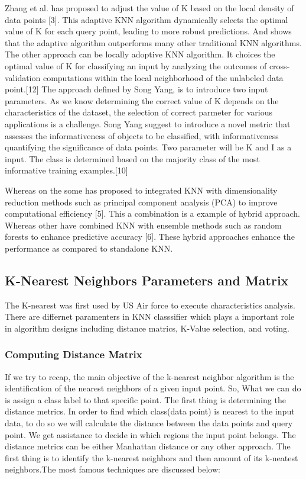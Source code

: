 \documentclass[conference]{IEEEtran}
\begin{document}
Zhang et al. has proposed to adjust the value of K based on the local density of data points [3]. This adaptive KNN algorithm dynamically selects the optimal value of K for each query point, leading to more robust predictions. And shows that the adaptive algorithm outperforms many other traditional KNN algorithms. The other approach can be locally adoptive KNN algorithm. It choices the optimal value of K for classifying an input by analyzing the outcomes of cross-validation computations within the local neighborhood of the unlabeled data point.[12]  The approach defined by Song Yang, is to introduce two input parameters. As we know determining the correct value of K depends on the characteristics of the dataset, the selection of correct parmeter for various applications is a challenge. Song Yang suggest to introduce a novel metric that assesses the informativeness of objects to be classified, with informativeness quantifying the significance of data points. 
Two parameter will be K and I as a input. The class is determined based on the majority class of the most informative training examples.[10]

Whereas on the some has proposed to integrated KNN with dimensionality reduction methods such as principal component analysis (PCA) to improve computational efficiency [5]. This a combination is a example of hybrid approach. Whereas other have combined KNN with ensemble methods such as random forests to enhance predictive accuracy [6]. These hybrid approaches enhance the performance as compared to standalone KNN. 








\subsection{K-Nearest Neighbors Parameters and Matrix}
The K-nearest was first used by US Air force to execute characteristics analysis. There are differnet paramenters in KNN classsifier which plays a important role in algorithm designs including distance matrics, K-Value selection, and voting. 




\subsubsection{Computing Distance Matrix}
If we try to recap, the main objective of the k-nearest neighbor algorithm is the identification of the nearest neighbors of a given input point. So, What we can do is assign a class label to that specific point. The first thing is determining the distance metrics. In order to find which class(data point) is nearest to the input data, to do so we will calculate the distance between the data points and query point. We get assistance to decide in which regions the input point belongs. The distance metrics can be either Manhattan distance or any other approach. The first thing is to identify the k-nearest neighbors and then amount of its k-neatest neighbors.The most famous techniques are discussed below:  
\end{document}
